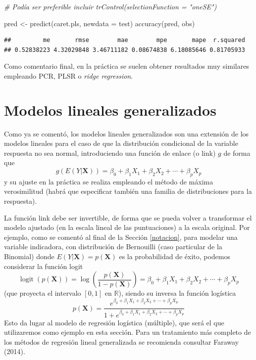 \documentclass[
]{book}
\newenvironment{Shaded}{\begin{snugshade}}{\end{snugshade}}
\newcommand{\AttributeTok}[1]{\textcolor[rgb]{0.77,0.63,0.00}{#1}}
\newcommand{\CommentTok}[1]{\textcolor[rgb]{0.56,0.35,0.01}{\textit{#1}}}
\newcommand{\FunctionTok}[1]{\textcolor[rgb]{0.00,0.00,0.00}{#1}}
\newcommand{\NormalTok}[1]{#1}
\newcommand{\OtherTok}[1]{\textcolor[rgb]{0.56,0.35,0.01}{#1}}
\theoremstyle{break}
\theoremstyle{definition}
\theoremstyle{definition}
\theoremstyle{definition}
\theoremstyle{definition}
\theoremstyle{remark}
\begin{document}
\begin{Shaded}
\begin{Highlighting}[]
\CommentTok{\# Podía ser preferible incluir \textasciigrave{}trControl(selectionFunction = "oneSE")\textasciigrave{}}

\NormalTok{pred }\OtherTok{\textless{}{-}} \FunctionTok{predict}\NormalTok{(caret.pls, }\AttributeTok{newdata =}\NormalTok{ test)}
\FunctionTok{accuracy}\NormalTok{(pred, obs)}
\end{Highlighting}
\end{Shaded}

\begin{verbatim}
##         me       rmse        mae        mpe       mape  r.squared 
## 0.52838223 4.32029848 3.46711182 0.08674838 6.18085646 0.81705933
\end{verbatim}

Como comentario final, en la práctica se suelen obtener resultados muy similares empleando PCR, PLSR o \emph{ridge regression}.

\hypertarget{reg-glm}{%
\section{Modelos lineales generalizados}\label{reg-glm}}

Como ya se comentó, los modelos lineales generalizados son una extensión de los modelos lineales para el caso de que la distribución condicional de la variable respuesta no sea normal, introduciendo una función de enlace (o link) \(g\) de forma que
\[g\left(E(Y | \mathbf{X} )\right) = \beta_{0}+\beta_{1}X_{1}+\beta_{2}X_{2}+\cdots+\beta_{p}X_{p}\]
y su ajuste en la práctica se realiza empleando el método de máxima verosimilitud (habrá que especificar también una familia de distribuciones para la respuesta).

La función link debe ser invertible, de forma que se pueda volver a transformar el modelo ajustado (en la escala lineal de las puntuaciones) a la escala original.
Por ejemplo, como se comentó al final de la Sección \ref{notacion}, para modelar una variable indicadora, con distribución de Bernouilli (caso particular de la Binomial) donde \(E(Y | \mathbf{X} ) = p(\mathbf{X})\) es la probabilidad de éxito, podemos considerar la función logit
\[\operatorname{logit}(p(\mathbf{X}))=\log\left( \frac{p(\mathbf{X})}{1-p(\mathbf{X})} \right) = \beta_{0}+\beta_{1}X_{1}+\beta_{2}X_{2}+\cdots+\beta_{p}X_{p}\]
(que proyecta el intervalo \([0, 1]\) en \(\mathbb{R}\)), siendo su inversa la función logística
\[p(\mathbf{X}) = \frac{e^{\beta_{0}+\beta_{1}X_{1}+\beta_{2}X_{2}+\cdots+\beta_{p}X_{p}}}{1 + e^{\beta_{0}+\beta_{1}X_{1}+\beta_{2}X_{2}+\cdots+\beta_{p}X_{p}}}\]
Esto da lugar al modelo de regresión logística (múltiple), que será el que utilizaremos como ejemplo en esta sección.
Para un tratamiento más completo de los métodos de regresión lineal generalizada se recomienda consultar Faraway (2014).
\end{document}
